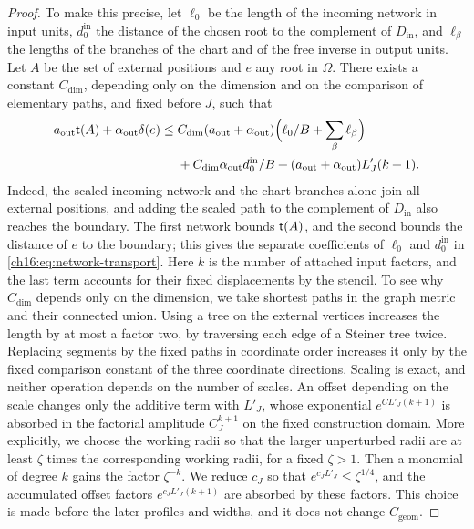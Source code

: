 \begin{proof}
To make this precise, let $\ell_0$ be the length of the incoming network in input units, $d_0^{\mathrm{in}}$ the distance of the chosen root to the complement of $D_{\mathrm{in}}$, and $\ell_\beta$ the lengths of the branches of the chart and of the free inverse in output units. Let $A$ be the set of external positions and $e$ any root in $\Omega$. There exists a constant $C_{\mathrm{dim}}$, depending only on the dimension and on the comparison of elementary paths, and fixed before $J$, such that
\begin{equation}\label{ch16:eq:network-transport}
 \begin{split}
 a_{\mathrm{out}}\mathsf t(A)+\alpha_{\mathrm{out}}\delta(e)
 \le{}&C_{\mathrm{dim}}(a_{\mathrm{out}}+\alpha_{\mathrm{out}})
                   \Bigl(\ell_0/B+\sum_\beta\ell_\beta\Bigr)\\
 &+C_{\mathrm{dim}}\alpha_{\mathrm{out}}d_0^{\mathrm{in}}/B
          +(a_{\mathrm{out}}+\alpha_{\mathrm{out}})L'_J(k+1).
 \end{split}
\end{equation}
Indeed, the scaled incoming network and the chart branches alone join all external positions, and adding the scaled path to the complement of $D_{\mathrm{in}}$ also reaches the boundary. The first network bounds $\mathsf t(A)$, and the second bounds the distance of $e$ to the boundary; this gives the separate coefficients of $\ell_0$ and $d_0^{\mathrm{in}}$ in \eqref{ch16:eq:network-transport}. Here $k$ is the number of attached input factors, and the last term accounts for their fixed displacements by the stencil. To see why $C_{\mathrm{dim}}$ depends only on the dimension, we take shortest paths in the graph metric and their connected union. Using a tree on the external vertices increases the length by at most a factor two, by traversing each edge of a Steiner tree twice. Replacing segments by the fixed paths in coordinate order increases it only by the fixed comparison constant of the three coordinate directions. Scaling is exact, and neither operation depends on the number of scales. An offset depending on the scale changes only the additive term with $L'_J$, whose exponential $e^{CL'_J(k+1)}$ is absorbed in the factorial amplitude $C_J^{k+1}$ on the fixed construction domain. More explicitly, we choose the working radii so that the larger unperturbed radii are at least $\zeta$ times the corresponding working radii, for a fixed $\zeta>1$. Then a monomial of degree $k$ gains the factor $\zeta^{-k}$. We reduce $c_J$ so that $e^{c_JL'_J}\le\zeta^{1/4}$, and the accumulated offset factors $e^{c_JL'_J(k+1)}$ are absorbed by these factors. This choice is made before the later profiles and widths, and it does not change $C_{\mathrm{geom}}$.


\end{proof}
